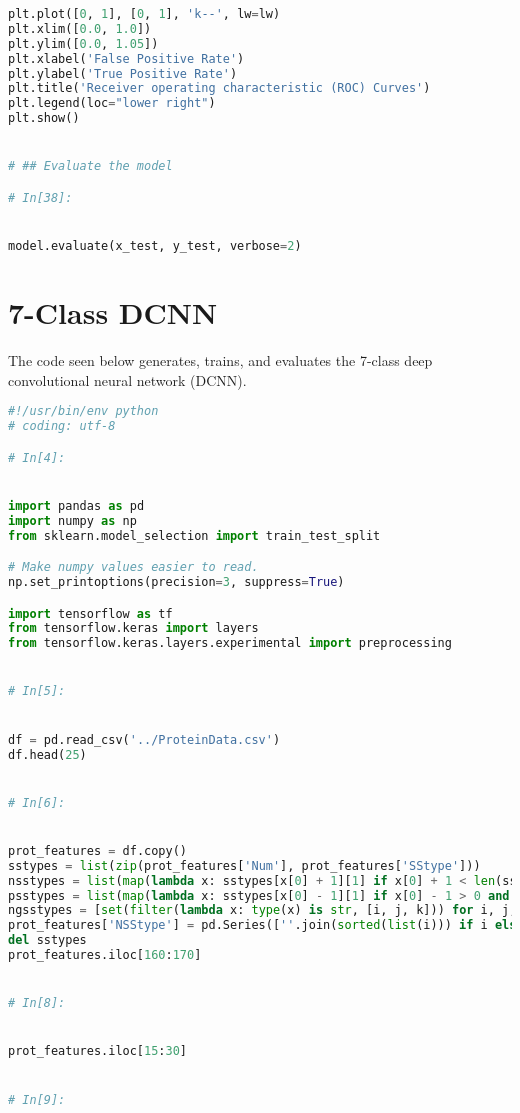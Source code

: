 \documentclass[12pt,letterpaper,oneside,reqno]{book}
\theoremstyle{plain}
\theoremstyle{definition}
\theoremstyle{plain}
\theoremstyle{remark}
\theoremstyle{plain}
\theoremstyle{definition}
\theoremstyle{plain}
\begin{document}
\begin{appendices}
\begin{lstlisting}[language=Python, label=lst:3classdcnnfull, frame=single]
plt.plot([0, 1], [0, 1], 'k--', lw=lw)
plt.xlim([0.0, 1.0])
plt.ylim([0.0, 1.05])
plt.xlabel('False Positive Rate')
plt.ylabel('True Positive Rate')
plt.title('Receiver operating characteristic (ROC) Curves')
plt.legend(loc="lower right")
plt.show()


# ## Evaluate the model

# In[38]:


model.evaluate(x_test, y_test, verbose=2)


\end{lstlisting}

\section{7-Class DCNN}
The code seen below generates, trains, and evaluates the 7-class deep convolutional neural network (DCNN).
\begin{lstlisting}[language=Python, label=lst:7classdcnnfull, frame=single]
#!/usr/bin/env python
# coding: utf-8

# In[4]:


import pandas as pd
import numpy as np
from sklearn.model_selection import train_test_split

# Make numpy values easier to read.
np.set_printoptions(precision=3, suppress=True)

import tensorflow as tf
from tensorflow.keras import layers
from tensorflow.keras.layers.experimental import preprocessing


# In[5]:


df = pd.read_csv('../ProteinData.csv')
df.head(25)


# In[6]:


prot_features = df.copy()
sstypes = list(zip(prot_features['Num'], prot_features['SStype']))
nsstypes = list(map(lambda x: sstypes[x[0] + 1][1] if x[0] + 1 < len(sstypes) and sstypes[x[0] + 1][0] == x[1][0] + 1 else np.nan, enumerate(sstypes)))
psstypes = list(map(lambda x: sstypes[x[0] - 1][1] if x[0] - 1 > 0 and sstypes[x[0] - 1][0] == x[1][0] - 1 else np.nan, enumerate(sstypes)))
ngsstypes = [set(filter(lambda x: type(x) is str, [i, j, k])) for i, j, k in zip(nsstypes, psstypes, (l for _, l in sstypes))]
prot_features['NSStype'] = pd.Series([''.join(sorted(list(i))) if i else np.nan for i in ngsstypes])
del sstypes
prot_features.iloc[160:170]


# In[8]:


prot_features.iloc[15:30]


# In[9]:



\end{lstlisting}
\end{appendices}
\end{document}
